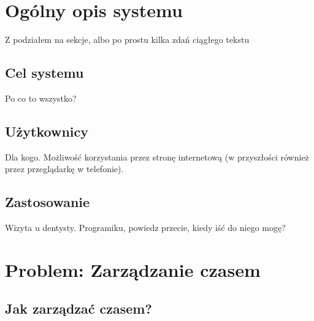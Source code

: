 \documentclass[pdflatex,11pt]{aghdpl}
\author{Marta~Drabarczyk, Krzysztof~Kutt, Michał~Nowak}
\date{2012}
\begin{document}
\titlepages

\tableofcontents
\clearpage

\chapter{Ogólny opis systemu}

Z podziałem na sekcje, albo po prostu kilka zdań ciągłego tekstu

\section{Cel systemu}

Po co to wszystko?

\section{Użytkownicy}

Dla kogo. Możliwość korzystania przez stronę internetową (w przyszłości również przez przeglądarkę w telefonie).

\section{Zastosowanie}

Wizyta u dentysty. Programiku, powiedz przecie, kiedy iść do niego mogę?





\chapter{Problem: Zarządzanie czasem}

\section{Jak zarządzać czasem?}
\end{document}
